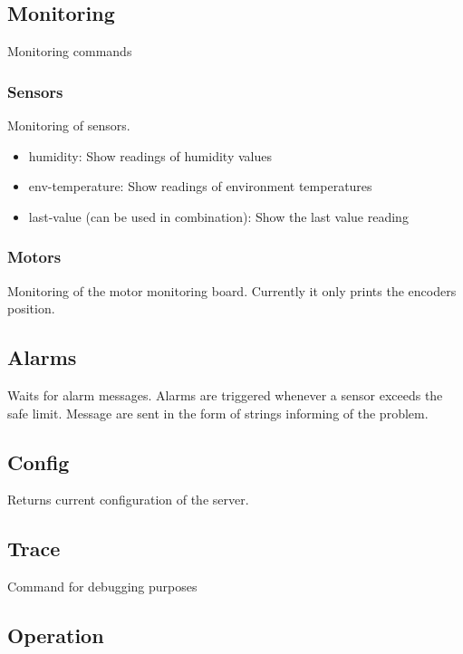 \documentclass[letterpaper, 10 pt]{article}
\begin{document}
\subsection{Monitoring}
Monitoring commands
\subsubsection{Sensors}
Monitoring of sensors. 
\begin{itemize}
	\item humidity: Show readings of humidity values 
	\item env-temperature: Show readings of environment temperatures
	\item last-value (can be used in combination): Show the last value reading
\end{itemize}
\subsubsection{Motors}
Monitoring of the motor monitoring board. Currently it only prints the encoders position.

\subsection{Alarms}
Waits for alarm messages. Alarms are triggered whenever a sensor exceeds the safe limit. Message are sent in the form of strings informing of the problem.

\subsection{Config}
Returns current configuration of the server.

\subsection{Trace}
Command for debugging purposes

\subsection{Operation}
\end{document}
